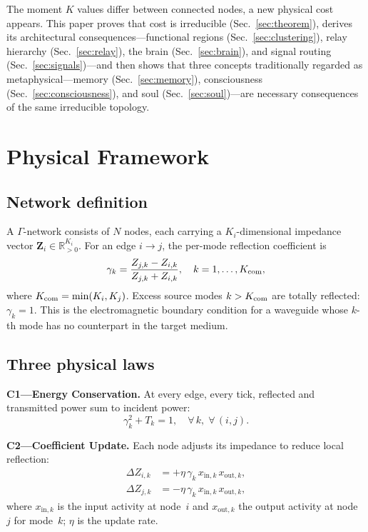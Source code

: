 \documentclass[aps,pre,twocolumn,superscriptaddress,floatfix]{revtex4-2}
\begin{document}
The moment $K$ values differ between connected nodes, a
new physical cost appears.
This paper proves that cost is irreducible
(Sec.~\ref{sec:theorem}), derives its architectural
consequences---functional regions
(Sec.~\ref{sec:clustering}), relay hierarchy
(Sec.~\ref{sec:relay}), the brain
(Sec.~\ref{sec:brain}), and signal routing
(Sec.~\ref{sec:signals})---and then shows that three
concepts traditionally regarded as metaphysical---memory
(Sec.~\ref{sec:memory}), consciousness
(Sec.~\ref{sec:consciousness}), and soul
(Sec.~\ref{sec:soul})---are necessary consequences
of the same irreducible topology.


\section{Physical Framework}
\label{sec:framework}

\subsection{Network definition}

A $\Gamma$-network consists of $N$ nodes, each carrying a
$K_i$-dimensional impedance vector
$\mathbf{Z}_i \in \mathbb{R}^{K_i}_{>0}$.
For an edge $i \to j$, the per-mode reflection coefficient is
\begin{equation}
  \gamma_k = \frac{Z_{j,k} - Z_{i,k}}{Z_{j,k} + Z_{i,k}},
  \quad k = 1, \ldots, K_{\text{com}},
  \label{eq:gamma}
\end{equation}
where $K_{\text{com}} = \min(K_i, K_j)$.
Excess source modes $k > K_{\text{com}}$ are totally reflected:
$\gamma_k = 1$.
This is the electromagnetic boundary condition for a
waveguide whose $k$-th mode has no counterpart in the
target medium.

\subsection{Three physical laws}
\label{sec:laws}

\textbf{C1---Energy Conservation.}
At every edge, every tick, reflected and transmitted power
sum to incident power:
\begin{equation}
  \gamma_k^2 + T_k = 1, \quad \forall\, k,\; \forall\,(i,j).
  \label{eq:C1}
\end{equation}

\textbf{C2---Coefficient Update.}
Each node adjusts its impedance to reduce local reflection:
\begin{align}
  \Delta Z_{i,k} &= +\eta\,\gamma_k\,x_{\text{in},k}\,
    x_{\text{out},k},
  \label{eq:C2a} \\
  \Delta Z_{j,k} &= -\eta\,\gamma_k\,x_{\text{in},k}\,
    x_{\text{out},k},
  \label{eq:C2b}
\end{align}
where $x_{\text{in},k}$ is the input activity at node~$i$
and $x_{\text{out},k}$ the output activity at node~$j$
for mode~$k$; $\eta$ is the update rate.
\end{document}
